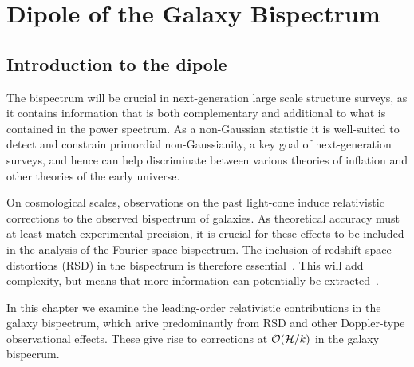 \chapter{Dipole of the Galaxy Bispectrum}
\label{chapter:dipole}

\section{Introduction to the dipole}

The bispectrum will be crucial in next-generation large scale structure surveys, as it contains information that is both complementary and additional to what is contained in the power spectrum. As a non-Gaussian statistic it is well-suited to detect and constrain primordial non-Gaussianity, a key goal of next-generation surveys, and hence can help discriminate between various theories of inflation and other theories of the early universe.

On cosmological scales, observations on the past light-cone induce relativistic corrections to the observed bispectrum of galaxies. As theoretical accuracy must at least match experimental precision, it is crucial for these effects to be included in the analysis of the Fourier-space bispectrum. The inclusion of redshift-space distortions (RSD) in the bispectrum is therefore essential~\citep{Verde:1998zr,Scoccimarro:1999ed}. This will add complexity, but means that more information can potentially be extracted~\citep{Tellarini:2016sgp}.

In this chapter we examine the leading-order relativistic contributions in the galaxy bispectrum, which arive predominantly from RSD and other Doppler-type observational effects. These give rise to corrections at $\mathcal{O}(\mathcal{H}/k)$ in the galaxy bispecrum.


